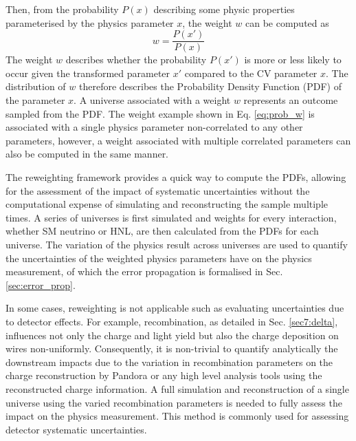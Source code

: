 
Then, from the probability $P(x)$ describing some physic properties parameterised by the physics parameter $x$, the weight $w$ can be computed as
\begin{equation}
\label{eq:prob_w}
	w = \frac{P(x')}{P(x)}
\end{equation}
The weight $w$ describes whether the probability $P(x')$ is more or less likely to occur given the transformed parameter $x'$ compared to the CV parameter $x$.
The distribution of $w$ therefore describes the Probability Density Function (PDF) of the parameter $x$.
A universe associated with a weight $w$ represents an outcome sampled from the PDF.
The weight example shown in Eq. \ref{eq:prob_w} is associated with a single physics parameter non-correlated to any other parameters, however, a weight associated with multiple correlated parameters can also be computed in the same manner.

The reweighting framework provides a quick way to compute the PDFs, allowing for the assessment of the impact of systematic uncertainties without the computational expense of simulating and reconstructing the sample multiple times.
A series of universes is first simulated and weights for every interaction, whether SM neutrino or HNL, are then calculated from the PDFs for each universe.
The variation of the physics result across universes are used to quantify the uncertainties of the weighted physics parameters have on the physics measurement, of which the error propagation is formalised in Sec. \ref{sec:error_prop}.  

In some cases, reweighting is not applicable such as evaluating uncertainties due to detector effects.
For example, recombination, as detailed in Sec. \ref{sec7:delta}, influences not only the charge and light yield but also the charge deposition on wires non-uniformly. 
Consequently, it is non-trivial to quantify analytically the downstream impacts due to the variation in recombination parameters on the charge reconstruction by Pandora or any high level analysis tools using the reconstructed charge information.
A full simulation and reconstruction of a single universe using the varied recombination parameters is needed to fully assess the impact on the physics measurement. 
This method is commonly used for assessing detector systematic uncertainties.

